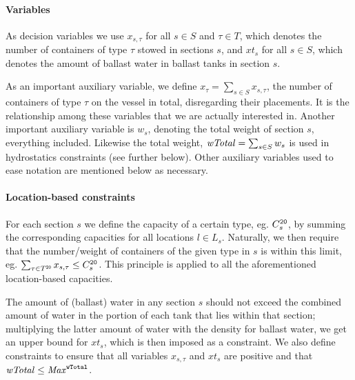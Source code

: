 \paragraph{Variables}
As decision variables we use $x_{s,\tau}$ for all $s\in S$ and $\tau \in T$, which denotes the number of containers of type $\tau$ stowed in sections $s$, and $xt_s$ for all $s\in S$, which denotes the amount of ballast water in ballast tanks in section $s$. 

As an important auxiliary variable, we define $x_\tau = \sum_{s\in S} x_{s,\tau}$, the number of containers of type $\tau$ on the vessel in total, disregarding their placements. It is the relationship among these variables that we are actually interested in.  
Another important auxiliary variable is $w_s$, denoting the total weight of section $s$, everything included. Likewise the total weight, $\mathit{wTotal} = \sum_{s\in S}w_s$ is used in hydrostatics constraints (see further below). 
Other auxiliary variables used to ease notation are mentioned below as necessary.

\paragraph{Location-based constraints}
For each section $s$ we define the capacity of a certain type, eg. $C^{\texttt{20}}_s$, by summing the corresponding capacities for all locations $l\in L_s$. Naturally, we then require that the number/weight of containers of the given type in $s$ is within this limit, eg. $\sum_{\tau \in T^{\texttt{20}}}x_{s,\tau}\leq C^{\texttt{20}}_s$. 
This principle is applied to all the aforementioned location-based capacities.

The amount of (ballast) water in any section $s$ should not exceed the combined amount of water in the portion of each tank that lies within that section; multiplying the latter amount  of water with the density for ballast water, we get an upper bound for $xt_s$, which is then imposed as a constraint.
We also define constraints to ensure that all variables $x_{s,\tau}$ and $xt_s$ are positive and that $\mathit{wTotal}\leq\mathit{Max}^{\texttt{wTotal}}$. 

